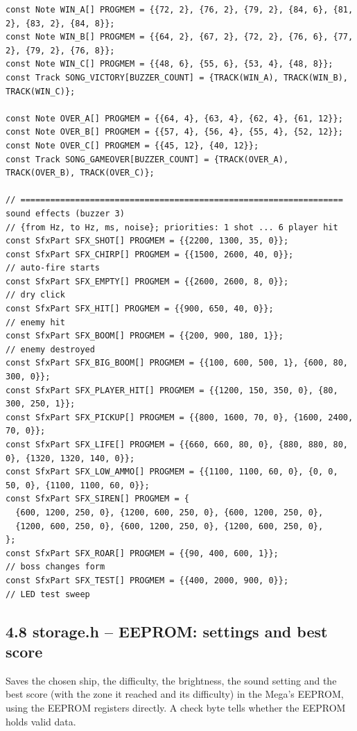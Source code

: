 \documentclass[11pt,a4paper]{article}
\begin{document}
\begin{lstlisting}[language=Arduino]
const Note WIN_A[] PROGMEM = {{72, 2}, {76, 2}, {79, 2}, {84, 6}, {81, 2}, {83, 2}, {84, 8}};
const Note WIN_B[] PROGMEM = {{64, 2}, {67, 2}, {72, 2}, {76, 6}, {77, 2}, {79, 2}, {76, 8}};
const Note WIN_C[] PROGMEM = {{48, 6}, {55, 6}, {53, 4}, {48, 8}};
const Track SONG_VICTORY[BUZZER_COUNT] = {TRACK(WIN_A), TRACK(WIN_B), TRACK(WIN_C)};

const Note OVER_A[] PROGMEM = {{64, 4}, {63, 4}, {62, 4}, {61, 12}};
const Note OVER_B[] PROGMEM = {{57, 4}, {56, 4}, {55, 4}, {52, 12}};
const Note OVER_C[] PROGMEM = {{45, 12}, {40, 12}};
const Track SONG_GAMEOVER[BUZZER_COUNT] = {TRACK(OVER_A), TRACK(OVER_B), TRACK(OVER_C)};

// ================================================================= sound effects (buzzer 3)
// {from Hz, to Hz, ms, noise}; priorities: 1 shot ... 6 player hit
const SfxPart SFX_SHOT[] PROGMEM = {{2200, 1300, 35, 0}};
const SfxPart SFX_CHIRP[] PROGMEM = {{1500, 2600, 40, 0}};                  // auto-fire starts
const SfxPart SFX_EMPTY[] PROGMEM = {{2600, 2600, 8, 0}};                   // dry click
const SfxPart SFX_HIT[] PROGMEM = {{900, 650, 40, 0}};                      // enemy hit
const SfxPart SFX_BOOM[] PROGMEM = {{200, 900, 180, 1}};                    // enemy destroyed
const SfxPart SFX_BIG_BOOM[] PROGMEM = {{100, 600, 500, 1}, {600, 80, 300, 0}};
const SfxPart SFX_PLAYER_HIT[] PROGMEM = {{1200, 150, 350, 0}, {80, 300, 250, 1}};
const SfxPart SFX_PICKUP[] PROGMEM = {{800, 1600, 70, 0}, {1600, 2400, 70, 0}};
const SfxPart SFX_LIFE[] PROGMEM = {{660, 660, 80, 0}, {880, 880, 80, 0}, {1320, 1320, 140, 0}};
const SfxPart SFX_LOW_AMMO[] PROGMEM = {{1100, 1100, 60, 0}, {0, 0, 50, 0}, {1100, 1100, 60, 0}};
const SfxPart SFX_SIREN[] PROGMEM = {
  {600, 1200, 250, 0}, {1200, 600, 250, 0}, {600, 1200, 250, 0},
  {1200, 600, 250, 0}, {600, 1200, 250, 0}, {1200, 600, 250, 0},
};
const SfxPart SFX_ROAR[] PROGMEM = {{90, 400, 600, 1}};                     // boss changes form
const SfxPart SFX_TEST[] PROGMEM = {{400, 2000, 900, 0}};                   // LED test sweep
\end{lstlisting}

\clearpage
\subsection*{4.8 storage.h – EEPROM: settings and best score}
Saves the chosen ship, the difficulty, the brightness, the sound setting and the best score (with the zone it reached and its difficulty) in the Mega's EEPROM, using the EEPROM registers directly. A check byte tells whether the EEPROM holds valid data.
\end{document}
